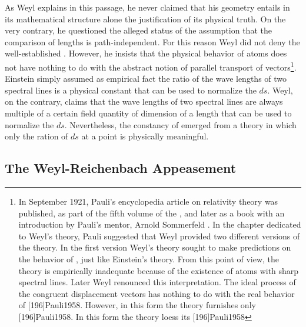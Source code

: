 \documentclass[draft]{article}
\newcommand{\WT}{Weyl's theory\xspace}
\begin{document}
As Weyl explains in this passage, he never claimed that his geometry entails in its mathematical structure alone the \apr justification of its physical truth. On the very contrary, he questioned the alleged \apr status of the assumption that the comparison of lengths is path-independent. For this reason Weyl did not deny the well-established . However, he insists that the physical behavior of atoms does not have nothing to do with the abstract notion of parallel transport of vectors\footnote{\label{pauli}In September 1921, Pauli's encyclopedia article on relativity theory was published, as part of the fifth volume of the , and later as a book with an introduction by Pauli's mentor, Arnold Sommerfeld \citep{Pauli1921}. In the chapter dedicated to \WT, Pauli suggested that Weyl provided two different versions of the theory. In the first version \WT sought to make predictions on the behavior of \rac, just like Einstein's theory. From this point of view, the theory is empirically inadequate because of the existence of atoms with sharp spectral lines. Later Weyl renounced this interpretation. The ideal process of the congruent displacement vectors has nothing to do with the real behavior of \rac {}[196]{Pauli1958}. However, in this form the theory furnishes only  [196]{Pauli1958}. In this form the theory loess its  [196]{Pauli1958}}. Einstein simply assumed as empirical fact the ratio of the wave lengths of two spectral lines is a  physical constant that can be used to normalize the $ds$. Weyl, on the contrary, claims that the wave lengths of two spectral lines are always multiple of a certain field quantity of dimension of a length that can be used to normalize the $ds$. Nevertheless, the constancy of emerged from a theory in which only the ration of $ds$ at a point is physically meaningful.

\subsection{The Weyl-Reichenbach Appeasement}

  
\end{document}
